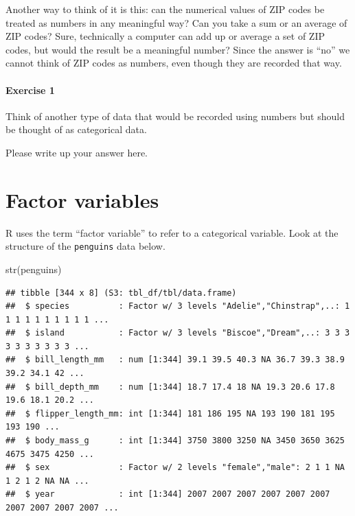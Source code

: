\documentclass[
]{book}
\newenvironment{Shaded}{\begin{snugshade}}{\end{snugshade}}
\newcommand{\FunctionTok}[1]{\textcolor[rgb]{0.00,0.00,0.00}{#1}}
\newcommand{\NormalTok}[1]{#1}
\begin{document}
Another way to think of it is this: can the numerical values of ZIP codes be treated as numbers in any meaningful way? Can you take a sum or an average of ZIP codes? Sure, technically a computer can add up or average a set of ZIP codes, but would the result be a meaningful number? Since the answer is ``no'' we cannot think of ZIP codes as numbers, even though they are recorded that way.

\hypertarget{exercise-1}{%
\paragraph*{Exercise 1}\label{exercise-1}}

Think of another type of data that would be recorded using numbers but should be thought of as categorical data.

Please write up your answer here.

\hypertarget{categorical-factor}{%
\section{Factor variables}\label{categorical-factor}}

R uses the term ``factor variable'' to refer to a categorical variable. Look at the structure of the \texttt{penguins} data below.

\begin{Shaded}
\begin{Highlighting}[]
\FunctionTok{str}\NormalTok{(penguins)}
\end{Highlighting}
\end{Shaded}

\begin{verbatim}
## tibble [344 x 8] (S3: tbl_df/tbl/data.frame)
##  $ species          : Factor w/ 3 levels "Adelie","Chinstrap",..: 1 1 1 1 1 1 1 1 1 1 ...
##  $ island           : Factor w/ 3 levels "Biscoe","Dream",..: 3 3 3 3 3 3 3 3 3 3 ...
##  $ bill_length_mm   : num [1:344] 39.1 39.5 40.3 NA 36.7 39.3 38.9 39.2 34.1 42 ...
##  $ bill_depth_mm    : num [1:344] 18.7 17.4 18 NA 19.3 20.6 17.8 19.6 18.1 20.2 ...
##  $ flipper_length_mm: int [1:344] 181 186 195 NA 193 190 181 195 193 190 ...
##  $ body_mass_g      : int [1:344] 3750 3800 3250 NA 3450 3650 3625 4675 3475 4250 ...
##  $ sex              : Factor w/ 2 levels "female","male": 2 1 1 NA 1 2 1 2 NA NA ...
##  $ year             : int [1:344] 2007 2007 2007 2007 2007 2007 2007 2007 2007 2007 ...
\end{verbatim}
\end{document}
